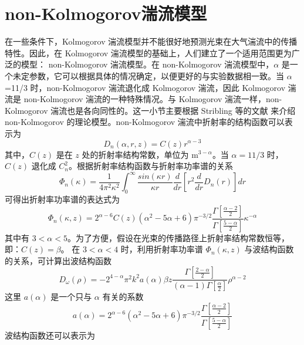 \documentclass[master]{thesis-uestc}
\begin{document}
\section{non-Kolmogorov湍流模型}
在一些条件下，Kolmogorov 湍流模型并不能很好地预测光束在大气湍流中的传播特性。因此，在 Kolmogorov 湍流模型的基础上，人们建立了一个适用范围更为广泛的模型： non-Kolmogorov 湍流模型。在 non-Kolmogorov 湍流模型中，$\alpha$ 是一个未定参数，它可以根据具体的情况确定，以便更好的与实验数据相一致。当 $\alpha$=11/3 时，non-Kolmogorov 湍流退化成 Kolmogorov 湍流，因此 Kolmogorov 湍流是 non-Kolmogorov 湍流的一种特殊情况。与 Kolmogorov 湍流一样，non-Kolmogorov 湍流也是各向同性的。这一小节主要根据 Stribling 等的文献 \citeup{} 来介绍 non-Kolmogorov 的理论模型。non-Kolmogorov 湍流中折射率的结构函数可以表示为
\begin{equation}\label{non_structure_function}
D_{n}(\alpha,r,z)=C(z)r^{\alpha-3}
\end{equation}
\noindent 其中，$C(z)$ 是在 $z$ 处的折射率结构常数，单位为 $\mathrm{m}^{3-\alpha}$。当 $\alpha=11/3$ 时，$C(z)$ 退化成 $C_{n}^2$。根据折射率结构函数与折射率功率谱的关系
\begin{equation}\label{non_power spectrum}
\Phi_{n}(\kappa)=\frac{1}{4\pi^{2}\kappa^2}\int^{\infty}_0\frac{sin(\kappa{r})}{\kappa{r}}\frac{d}{dr}\left[r^2\frac{d}{dr}D_{n}(r)\right]dr
\end{equation}
\noindent 可得出折射率功率谱的表达式为
\begin{equation}\label{non_power spectrum}
\Phi_{n}(\kappa,z)=2^{\alpha-6}C(z)(\alpha^2-5\alpha+6)\pi^{-3/2}\frac{\Gamma\left[\frac{\alpha-2}{2}\right]}{\Gamma\left[\frac{5-\alpha}{2}\right]}\kappa^{-\alpha}
\end{equation}
\noindent 其中有 $3<\alpha<5$。为了方便，假设在光束的传播路径上折射率结构常数恒等，即：$C(z)=\beta$。 在 $3<\alpha<4$ 时，利用折射率功率谱 $\Phi_{n}(\kappa,z)$ 与波结构函数的关系，可计算出波结构函数
\begin{equation}\label{non_wave_function}
 D_{\omega}(\rho)=-2^{4-\alpha}\pi^{2}k^{2}a(\alpha)\beta{z}\frac{\Gamma\left[\frac{2-\alpha}{2}\right]}{(\alpha-1)\Gamma\left[\frac{\alpha}{2}\right]}\rho^{\alpha-2}
\end{equation}
\noindent 这里 $a(\alpha)$ 是一个只与 $\alpha$ 有关的系数
\begin{equation}\label{non_wave_function2}
a(\alpha)=2^{\alpha-6}(\alpha^2-5\alpha+6)\pi^{-3/2}\frac{\Gamma\left[\frac{\alpha-2}{2}\right]}{\Gamma\left[\frac{5-\alpha}{2}\right]}
\end{equation}
波结构函数还可以表示为
\end{document}
